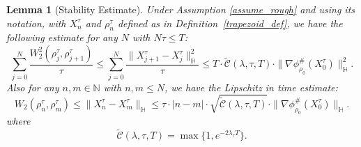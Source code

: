 \documentclass[11pt,a4paper]{amsart}
\newcommand{\1}{\mathds{1}}
\newtheorem{lemma}[theorem]{\textbf{Lemma}}
\numberwithin{equation}{section}
\begin{document}
\begin{lemma}[Stability Estimate] \label{classical_stability_lemma}  
Under Assumption \ref{assume_rough} and using its notation, with $X_n^\tau$ and $\rho_n^\tau$ defined as in Definition~\ref{trapezoid_def}, we have the following estimate for any $N$ with $N\tau \leq T$:
\begin{equation} 
    \sum_{j=0}^{N} \frac{W_2^2(\rho^{\tau}_j,\rho^{\tau}_{j+1}) }{\tau} 
    \leq \sum_{j=0}^{N} \frac{\|X_{j+1}^{\tau}-X_j^{\tau}\|^2_{\mathbb{H}} }{\tau} 
    \leq T \cdot \tilde{\mathcal{C}}(\lambda,\tau,T) \cdot \| \nabla \phi^{\#}_{\rho_0}(X_0^{\tau})\|^2_{\mathbb{H}}.
    \label{classical_stability}
\end{equation}
Also for any $n,m \in \mathbb{N}$ with $n,m \leq N$, we have the Lipschitz in time estimate:
\begin{equation}
    W_2(\rho_n^{\tau},\rho_m^{\tau}) 
    \leq \|X^{\tau}_{n}-X^{\tau}_m\|_{\mathbb{H}} 
    \leq    \tau \cdot |n-m| \cdot \sqrt{\tilde{\mathcal{C}}(\lambda,\tau,T)}  \cdot \|\nabla \phi^{\#}_{\rho_0}(X^{\tau}_0)\|_{\mathbb{H}}.
    \label{lipschitz_bound}
\end{equation}
where 
\[
    \tilde{\mathcal{C}}(\lambda,\tau,T) = \max \{ 1,e^{- 2\lambda_{\tau} T} \}.
\]
\end{lemma}
\end{document}
